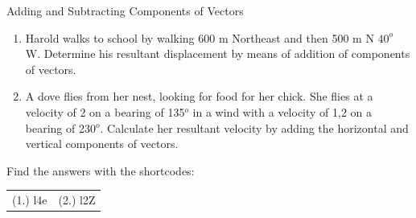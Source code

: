 \begin{exercises}{Adding and Subtracting Components of Vectors}{
\begin{enumerate}[noitemsep, label=\textbf{\arabic*}.]
\item Harold walks to school by walking 600 m Northeast and then 500 m N $40^o$ W. Determine his resultant displacement by means of addition of components of vectors.
\item A dove flies from her nest, looking for food for her chick. She flies at a velocity of 2 \ms on a bearing of 135${^o}$ in a wind with a velocity of 1,2 \ms on a bearing of 230${^o}$. Calculate her resultant velocity by adding the horizontal and vertical components of vectors.
\end{enumerate}
}
\par {} Find the answers with the shortcodes:
 \par \begin{tabular}[h]{cc}
 (1.) l4e  &  (2.) l2Z   & \end{tabular}
\end{exercises}

